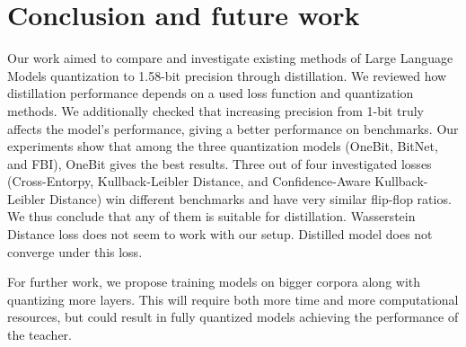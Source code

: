 \documentclass{article}
\begin{document}
\section{Conclusion and future work}
Our work aimed to compare and investigate existing methods of Large Language Models quantization to 1.58-bit precision through distillation. We reviewed how distillation performance depends on a used loss function and quantization methods. We additionally checked that increasing precision from 1-bit truly affects the model's performance, giving a better performance on benchmarks. Our experiments show that among the three quantization models (OneBit, BitNet, and FBI), OneBit gives the best results. Three out of four investigated losses (Cross-Entorpy, Kullback-Leibler Distance, and Confidence-Aware Kullback-Leibler Distance) win different benchmarks and have very similar flip-flop ratios. We thus conclude that any of them is suitable for distillation. Wasserstein Distance loss does not seem to work with our setup. Distilled model does not converge under this loss.

For further work, we propose training models on bigger corpora along with quantizing more layers. This will require both more time and more computational resources, but could result in fully quantized models achieving the performance of the teacher.
 



\end{document}
